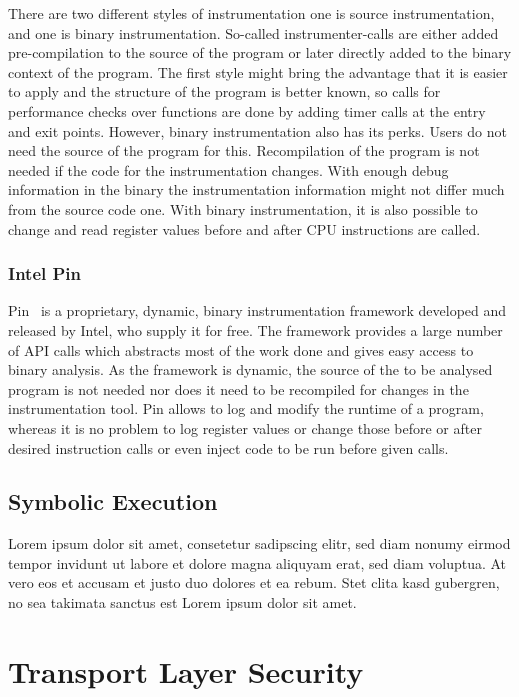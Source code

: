 There are two different styles of instrumentation one is source instrumentation,
and one is binary instrumentation. So-called instrumenter-calls are either added
pre-compilation to the source of the program or later directly added to the
binary context of the program. The first style might bring the advantage that it
is easier to apply and the structure of the program is better known, so calls
for performance checks over functions are done by adding timer calls at the
entry and exit points. However, binary instrumentation also has its perks. Users
do not need the source of the program for this. Recompilation of the program is
not needed if the code for the instrumentation changes. With enough debug
information in the binary the instrumentation information might not differ much
from the source code one. With binary instrumentation, it is also possible to
change and read register values before and after CPU instructions are called.


\subsubsection{Intel Pin}

Pin~\cite{pintool} is a proprietary, dynamic, binary instrumentation framework
developed and released by Intel, who supply it for free. The framework provides
a large number of API calls which abstracts most of the work done and gives easy
access to binary analysis. As the framework is dynamic, the source of the to be
analysed program is not needed nor does it need to be recompiled for changes in
the instrumentation tool. Pin allows to log and modify the runtime of a program,
whereas it is no problem to log register values or change those before or after
desired instruction calls or even inject code to be run before given calls.

\subsection{Symbolic Execution}

Lorem ipsum dolor sit amet, consetetur sadipscing elitr, sed diam nonumy eirmod
tempor invidunt ut labore et dolore magna aliquyam erat, sed diam voluptua. At
vero eos et accusam et justo duo dolores et ea rebum. Stet clita kasd gubergren,
no sea takimata sanctus est Lorem ipsum dolor sit amet.

\section{Transport Layer Security}

